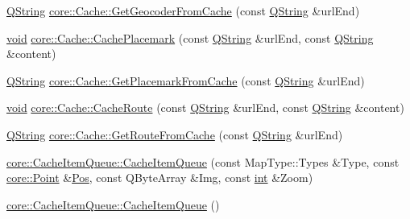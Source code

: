 \begin{DoxyCompactItemize}
\item 
\hyperlink{group___u_a_v_objects_plugin_gab9d252f49c333c94a72f97ce3105a32d}{Q\-String} \hyperlink{group___o_p_map_widget_ga03c3c69129aa5d774e0cfc1b7cc4ace7}{core\-::\-Cache\-::\-Get\-Geocoder\-From\-Cache} (const \hyperlink{group___u_a_v_objects_plugin_gab9d252f49c333c94a72f97ce3105a32d}{Q\-String} \&url\-End)
\item 
\hyperlink{group___u_a_v_objects_plugin_ga444cf2ff3f0ecbe028adce838d373f5c}{void} \hyperlink{group___o_p_map_widget_ga605683519dbd3609033f61edfdbd6da3}{core\-::\-Cache\-::\-Cache\-Placemark} (const \hyperlink{group___u_a_v_objects_plugin_gab9d252f49c333c94a72f97ce3105a32d}{Q\-String} \&url\-End, const \hyperlink{group___u_a_v_objects_plugin_gab9d252f49c333c94a72f97ce3105a32d}{Q\-String} \&content)
\item 
\hyperlink{group___u_a_v_objects_plugin_gab9d252f49c333c94a72f97ce3105a32d}{Q\-String} \hyperlink{group___o_p_map_widget_ga6b5384bc829769fac7099d2f62188361}{core\-::\-Cache\-::\-Get\-Placemark\-From\-Cache} (const \hyperlink{group___u_a_v_objects_plugin_gab9d252f49c333c94a72f97ce3105a32d}{Q\-String} \&url\-End)
\item 
\hyperlink{group___u_a_v_objects_plugin_ga444cf2ff3f0ecbe028adce838d373f5c}{void} \hyperlink{group___o_p_map_widget_ga39845c04f9d203c0a71e50b1576e71c6}{core\-::\-Cache\-::\-Cache\-Route} (const \hyperlink{group___u_a_v_objects_plugin_gab9d252f49c333c94a72f97ce3105a32d}{Q\-String} \&url\-End, const \hyperlink{group___u_a_v_objects_plugin_gab9d252f49c333c94a72f97ce3105a32d}{Q\-String} \&content)
\item 
\hyperlink{group___u_a_v_objects_plugin_gab9d252f49c333c94a72f97ce3105a32d}{Q\-String} \hyperlink{group___o_p_map_widget_gaa57f8065b3641c25a3305de4ab621abe}{core\-::\-Cache\-::\-Get\-Route\-From\-Cache} (const \hyperlink{group___u_a_v_objects_plugin_gab9d252f49c333c94a72f97ce3105a32d}{Q\-String} \&url\-End)
\item 
\hyperlink{group___o_p_map_widget_gadc9b31f39de2abe3de6041258d92a7bd}{core\-::\-Cache\-Item\-Queue\-::\-Cache\-Item\-Queue} (const Map\-Type\-::\-Types \&Type, const \hyperlink{structcore_1_1_point}{core\-::\-Point} \&\hyperlink{deflate_8h_a80a8610ae675eaeead82013bacde10a1}{Pos}, const Q\-Byte\-Array \&Img, const \hyperlink{ioapi_8h_a787fa3cf048117ba7123753c1e74fcd6}{int} \&Zoom)
\item 
\hyperlink{group___o_p_map_widget_ga51cf399db0ddbbef8d48f8f8e420f373}{core\-::\-Cache\-Item\-Queue\-::\-Cache\-Item\-Queue} ()
\item 

\end{DoxyCompactItemize}
